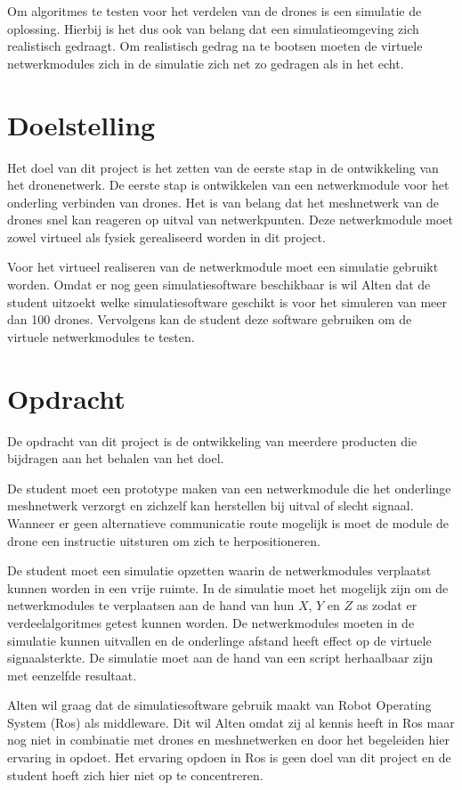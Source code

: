 \documentclass[a4paper, 11pt, oneside]{report}
\begin{document}
Om algoritmes te testen voor het verdelen van de drones is een simulatie de oplossing.
Hierbij is het dus ook van belang dat een simulatieomgeving zich realistisch gedraagt. 
Om realistisch gedrag na te bootsen moeten de virtuele netwerkmodules zich in de simulatie zich net zo gedragen als in het echt.

\section{Doelstelling}\label{sec:doelstelling}
Het doel van dit project is het zetten van de eerste stap in de ontwikkeling van het dronenetwerk.
De eerste stap is ontwikkelen van een netwerkmodule voor het onderling verbinden van drones.
Het is van belang dat het meshnetwerk van de drones snel kan reageren op uitval van netwerkpunten.
Deze netwerkmodule moet zowel virtueel als fysiek gerealiseerd worden in dit project.

Voor het virtueel realiseren van de netwerkmodule moet een simulatie gebruikt worden. 
Omdat er nog geen simulatiesoftware beschikbaar is wil Alten dat de student uitzoekt welke simulatiesoftware geschikt is voor het simuleren van meer dan 100 drones.
Vervolgens kan de student deze software gebruiken om de virtuele netwerkmodules te testen.

\section{Opdracht}\label{sec:opdracht}
De opdracht van dit project is de ontwikkeling van meerdere producten die bijdragen aan het behalen van het doel. 

De student moet een prototype maken van een netwerkmodule die het onderlinge meshnetwerk verzorgt en zichzelf kan herstellen bij uitval of slecht signaal.
Wanneer er geen alternatieve communicatie route mogelijk is moet de module de drone een instructie uitsturen om zich te herpositioneren.

De student moet een simulatie opzetten waarin de netwerkmodules verplaatst kunnen worden in een vrije ruimte. 
In de simulatie moet het mogelijk zijn om de netwerkmodules te verplaatsen aan de hand van hun $X$, $Y$ en $Z$ as zodat er verdeelalgoritmes getest kunnen worden.  
De netwerkmodules moeten in de simulatie kunnen uitvallen en de onderlinge afstand heeft effect op de virtuele signaalsterkte.
De simulatie moet aan de hand van een script herhaalbaar zijn met eenzelfde resultaat.

Alten wil graag dat de simulatiesoftware gebruik maakt van Robot Operating System (Ros) als middleware. 
Dit wil Alten omdat zij al kennis heeft in Ros maar nog niet in combinatie met drones en meshnetwerken en door het begeleiden hier ervaring in opdoet.
Het ervaring opdoen in Ros is geen doel van dit project en de student hoeft zich hier niet op te concentreren.
\end{document}
